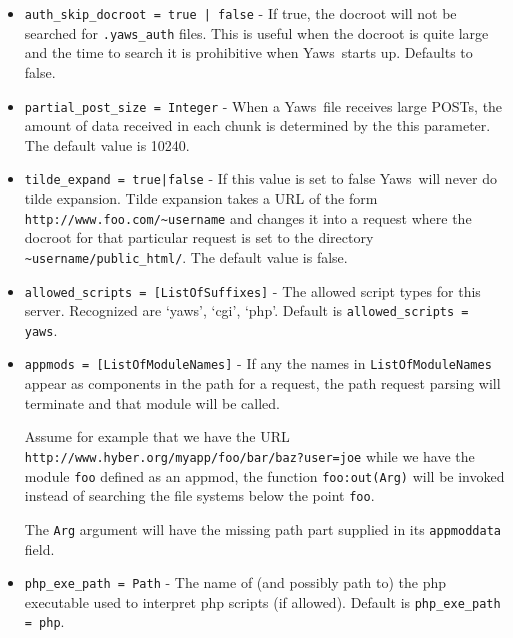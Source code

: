 \documentclass[11pt,oneside,english]{book}
\newcommand{\Yaws}            %
        {{\sc Yaws}}
\begin{document}
\begin{itemize}
\item       \verb+auth_skip_docroot = true | false+ -
              If true, the docroot will not be searched for
              \verb+.yaws_auth+ files. This is useful when the docroot
              is quite large and the time to search it is prohibitive
              when \Yaws\  starts up. Defaults to false.

\item       \verb+partial_post_size = Integer+ -
              When a \Yaws\  file receives large  POSTs,  the
              amount  of  data  received  in each chunk is
              determined by the this parameter.  The default
              value is 10240.

\item       \verb+tilde_expand = true|false+ -
              If  this  value  is  set  to false \Yaws\  will
              never do tilde  expansion.  Tilde expansion takes a URL
              of the form \verb+http://www.foo.com/~username+ and
              changes it into a request where the docroot for that
              particular request is set to the directory
              \verb+~username/public_html/+. The default value is
              false.

\item       \verb+allowed_scripts = [ListOfSuffixes]+ -
              The allowed script types for this server.  Recognized
              are `yaws', `cgi', `php'.  Default is
              \verb+allowed_scripts = yaws+.

\item       \verb+appmods = [ListOfModuleNames]+ -
              If any the names in \verb+ListOfModuleNames+ appear
              as components in the path for a request, the
              path request parsing will terminate and that
              module will be called.

              Assume  for  example  that  we  have  the  URL
              \verb+http://www.hyber.org/myapp/foo/bar/baz?user=joe+
              while we have the module \verb+foo+ defined  as  an
              appmod,  the  function  \verb+foo:out(Arg)+ will be
              invoked instead of searching the file systems
              below the point \verb+foo+.

              The \verb+Arg+ argument will have the missing path
              part supplied in its \verb+appmoddata+ field.

\item       \verb+php_exe_path = Path+ -
              The name of (and possibly path to) the php executable
	      used to interpret php scripts (if allowed).  Default is
	      \verb+php_exe_path = php+.


\end{itemize}
\end{document}
